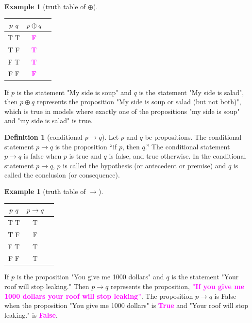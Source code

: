 \documentclass[letterpaper,10pt]{article}
\theoremstyle{plain}
\theoremstyle{definition}
\newtheorem{defn}[thm]{Definition}
\newtheorem{exmp}[thm]{Example}
\theoremstyle{remark}
\providecommand{\lxor}{\ensuremath{\oplus}}
\providecommand{\todo}[1]{\textcolor{magenta}{\textbf{#1}}}
\begin{document}
\begin{exmp}[truth table of $\lxor$]

\begin{center}
\begin{tabular}{ | c | c | c |} 
  \hline
 $p$ $q$ & $ p \lxor q$ \\
 \hline
  T T & \todo{F} \\ 
  T F & \todo{T} \\ 
  F T & \todo{T} \\ 
  F F & \todo{F} \\ 
  \hline
\end{tabular}
\end{center}
\end{exmp}
If $p$ is the statement "My side is soup" and $q$ is the statement "My side is salad", then $p \lxor q$ represents the proposition "My side is soup or salad (but not both)", which is true in models where exactly one of the propositions "my side is soup" and "my side is salad" is true.

\begin{defn}[conditional $p \to q$]
Let $p$ and $q$ be propositions. The conditional statement $p \to q$ is the proposition “if $p$, then
$q$.” The conditional statement $p \to q$ is false when $p$ is true and $q$ is false, and true otherwise.
In the conditional statement $p \to q$, $p$ is called the hypothesis (or antecedent or premise)
and $q$ is called the conclusion (or consequence).
\end{defn}
\begin{exmp}[truth table of $\to$]
\begin{center}
\begin{tabular}{ | c | c | c |} 
  \hline
 $p$ $q$ & $ p \to q$ \\
 \hline
  T T & T \\ 
  T F & F \\ 
  F T & T \\ 
  F F & T \\ 
  \hline
\end{tabular}
\end{center}
If $p$ is the proposition "You give me 1000 dollars" and $q$ is the statement "Your roof will stop leaking." Then $p \to q$ represents the proposition, 
\newline 
\todo{"If you give me 1000 dollars your roof  will stop leaking"}.
\newline
The proposition $p\to q$ is False when the proposition "You give me 1000 dollars" is \todo{True} and "Your roof will stop leaking." is \todo{False}.
\end{exmp}
\end{document}
